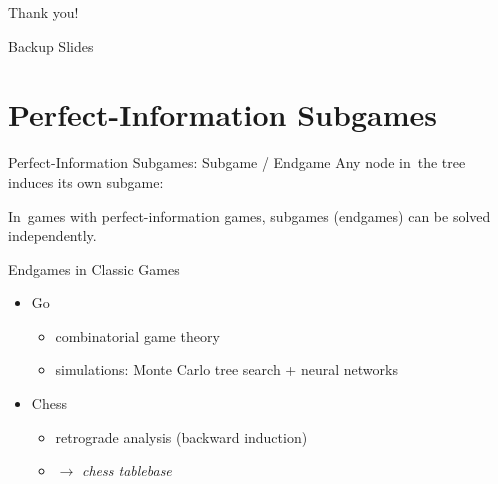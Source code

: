 \documentclass{beamer}
\theoremstyle{definition}
\begin{document}
  \begin{frame}[standout]
    \begin{center}
      Thank you!
    \end{center}
  \end{frame}


  \appendix

  \begin{frame}[standout]
    Backup Slides
  \end{frame}

  \section{Perfect-Information Subgames}

  \begin{frame}{Perfect-Information Subgames: Subgame / Endgame}
    Any node in~the tree induces its own subgame:
    \pause
    \begin{figure}[H]
      \raggedleft
      \scriptsize
      \def\svgwidth{.8\textwidth}
      
    \end{figure}
    \pause

    In~games with perfect-information games, subgames (endgames) can be solved independently.
  \end{frame}

  \begin{frame}{Endgames in Classic Games}
    \pause
    \begin{itemize}[<+- | alert@+>]
      \item Go
        \begin{itemize}
          \item combinatorial game theory
          \item simulations: Monte Carlo tree search + neural networks
        \end{itemize}
      \item Chess
        \begin{itemize}
          \item retrograde analysis (backward induction)
          \item $\to$ \emph{chess tablebase}
        \end{itemize}
    \end{itemize}
  \end{frame}
\end{document}
